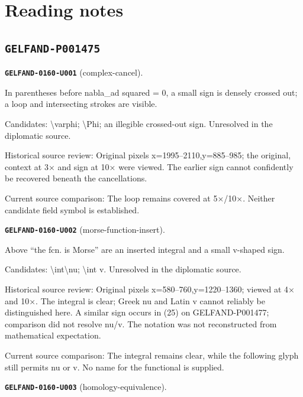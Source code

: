 \section*{Reading notes}
\subsection*{\texttt{GELFAND-P001475}}
\par\noindent\leavevmode{}\label{GELFAND-0160-U001}\label{GELFAND-P001475:complex-cancel}\textbf{\texttt{GELFAND-0160-U001}} (complex-cancel).\nopagebreak[4]\par
In parentheses before nabla\_ad squared = 0, a small sign is densely crossed out; a loop and intersecting strokes are visible.\par
Candidates: \textbackslash{}varphi; \textbackslash{}Phi; an illegible crossed-out sign. Unresolved in the diplomatic source.\par
Historical source review: Original pixels x=1995–2110,y=885–985; the original, context at 3× and sign at 10× were viewed. The earlier sign cannot confidently be recovered beneath the cancellations.\par
Current source comparison: The loop remains covered at 5×/10×. Neither candidate field symbol is established.\par\medskip
\par\noindent\leavevmode{}\label{GELFAND-0160-U002}\label{GELFAND-P001475:morse-function-insert}\textbf{\texttt{GELFAND-0160-U002}} (morse-function-insert).\nopagebreak[4]\par
Above “the fcn. is Morse” are an inserted integral and a small v-shaped sign.\par
Candidates: \textbackslash{}int\textbackslash{}nu; \textbackslash{}int v. Unresolved in the diplomatic source.\par
Historical source review: Original pixels x=580–760,y=1220–1360; viewed at 4× and 10×. The integral is clear; Greek nu and Latin v cannot reliably be distinguished here. A similar sign occurs in (25) on GELFAND-P001477; comparison did not resolve nu/v. The notation was not reconstructed from mathematical expectation.\par
Current source comparison: The integral remains clear, while the following glyph still permits nu or v. No name for the functional is supplied.\par\medskip
\par\noindent\leavevmode{}\label{GELFAND-0160-U003}\label{GELFAND-P001475:homology-equivalence}\textbf{\texttt{GELFAND-0160-U003}} (homology-equivalence).\nopagebreak[4]\par
